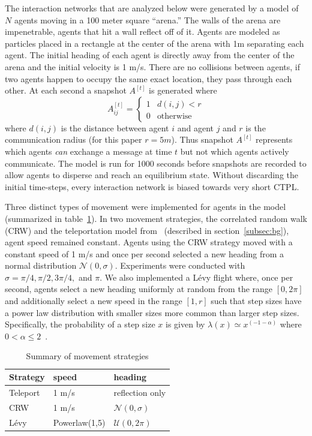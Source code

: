 \documentclass[conference]{IEEEtran}
\newcommand{\adj}[1]{A^{[#1]}}
\begin{document}
The interaction networks that are analyzed below were generated by a
model of $N$ agents moving in a 100 meter square ``arena.'' The walls
of the arena are impenetrable, agents that hit a wall reflect off of
it. Agents are modeled as particles placed in a rectangle at the
center of the arena with 1m separating each agent. The initial heading
of each agent is directly away from the center of the arena and the
initial velocity is 1 m/s. There are no collisions between agents, if
two agents happen to occupy the same exact location, they pass through
each other. At each second a snapshot $\adj{t}$ is generated where
\begin{equation}
  \adj{t}_{ij} = \begin{cases} 1 & d(i, j) < r \\ 0 & \text{otherwise} \end{cases}
  \label{eq:snapshot}
\end{equation}
where $d(i,j)$ is the distance between agent $i$ and agent $j$ and $r$
is the communication radius (for this paper $r = 5 m$). Thus snapshot
$\adj{t}$ represents which agents \emph{can} exchange a message at
time $t$ but not which agents actively communicate. The model is run
for 1000 seconds before snapshots are recorded to allow agents to
disperse and reach an equilibrium state. Without discarding the
initial time-steps, every interaction network is biased towards very
short CTPL.

Three distinct types of movement were implemented for agents in the
model (summarized in table~\ref{tab:strat}). In two movement
strategies, the correlated random walk (CRW) and the teleportation
model from~\cite{Tang2010} (described in section~\ref{subsec:bg}),
agent speed remained constant. Agents using the CRW strategy moved
with a constant speed of 1 m/s and once per second selected a new
heading from a normal distribution $\mathcal{N}(0,
\sigma)$. Experiments were conducted with $\sigma = \pi/4, \pi/2,
3\pi/4,$ and $\pi$. We also implemented a L\'evy flight where, once
per second, agents select a new heading uniformly at random from the
range $[0,2\pi]$ and additionally select a new speed in the range $[1,
  r]$ such that step sizes have a power law distribution with smaller
sizes more common than larger step sizes. Specifically, the
probability of a step size $x$ is given by $\lambda(x) \simeq
x^{(-1-\alpha)}$ where $0 < \alpha \le 2$~\cite{Chechkin2008}.

\begin{table}
  \begin{center}
  \begin{tabular}{l l l}
    Strategy & speed    & heading \\\hline
    Teleport & 1 m/s & reflection only \\
    CRW      & 1 m/s & $\mathcal{N}(0, \sigma)$ \\
    L\'evy   & Powerlaw(1,5) & $\mathcal{U}(0,2\pi)$
  \end{tabular}
  \end{center}
  \caption{Summary of movement strategies}
  \label{tab:strat}
\end{table}
\end{document}

